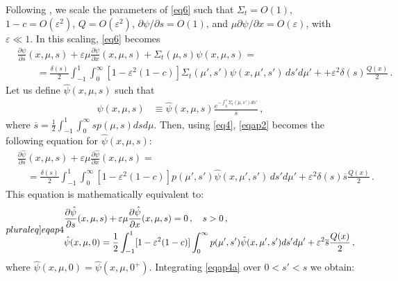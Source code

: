 \documentclass[12pt]{article}
\newcommand{\eps}{\varepsilon}
\begin{document}
{Following \cite{vaslar14a},  we scale the parameters of \cref{eq6} such that $\Sigma_t = O(1)$, $ 1-c = O(\varepsilon^2) $, $Q=O(\varepsilon^2)$,  $\partial \psi / \partial s = O(1)$, and $\mu \partial \psi/\partial x = O(\eps)$, with $\varepsilon \ll 1$.
In this scaling, \cref{eq6} becomes
  \begin{align}
    &\frac{\partial \psi}{\partial s}  (x, \mu,s) 
      + \eps\mu\frac{\partial\psi}{\partial x}(x, \mu, s)
       + \Sigma_t(\mu,s) \psi( x, \mu, s)   = \label{eqap1}\\
   & \quad\quad= \frac{\delta(s)}{2}\int_{-1}^1\int_0^{\infty}[1-\eps^2(1-c)]\Sigma_t(\mu',s') 
      \psi(x, \mu', s') \, ds' d\mu' + + \varepsilon^2 \delta(s)\frac{Q(x)}{2}\nonumber \, .
  \end{align}
Let us define $\hat\psi( x, \mu, s)$ such that
  \begin{align}\label{eqap2}
   \psi( x, \mu, s) &\equiv 
          \hat\psi(x, \mu, s) \frac{e^{-\int_0^s \Sigma_t(\mu,s') ds'}}{\overline{s}}\,,
  \end{align}
where $\overline{s} = \frac{1}{2}\int_{-1}^1\int_0^\infty s p(\mu,s)dsd\mu$.
Then, using \cref{eq4}, \cref{eqap2} becomes the following equation for $\hat\psi(x, \mu, s)$:
  \begin{align}\label{eqap3}
    &\frac{\partial \hat\psi}{\partial s} (x, \mu,s) 
      + \varepsilon \mu\frac{\partial\hat\psi}{\partial x}(x,\mu, s)  = \\
   & \quad= \frac{\delta(s)}{2} \int_{-1}^1 \int_0^{\infty} [1-\eps^2(1-c)] p(\mu',s')
      \hat\psi(x, \mu', s') \, ds' d\mu'       + \varepsilon^2 \delta(s) \overline{s} \frac{Q(x)}{2} \,.\nonumber
  \end{align}
This equation is mathematically equivalent to:
   \begin{subequations}\label[pluraleq]{eqap4}
   \begin{align}
      &\frac{\partial \hat\psi}{\partial s} (x, \mu,s) 
         + \varepsilon \mu\frac{\partial\hat\psi}{\partial x}(x, \mu, s) = 0 \,, \quad s > 0 \,,\label{eqap4a}\\
       &\hat\psi(x, \mu, 0)  =\frac{1}{2}\int_{-1}^1 [1-\eps^2(1-c)] \int_0^{\infty} p(\mu',s')
\hat\psi(x, \mu', s') ds' d\mu' + \varepsilon^2 \overline{s} \frac{Q(x)}{2} \,,
   \end{align}
   \end{subequations}
where $\hat\psi(x,\mu,0) = \hat\psi(x,\mu,0^+)$. Integrating \cref{eqap4a} over $0 < s' < s$ we obtain:
   \begin{align}

\end{align}}
\end{document}
